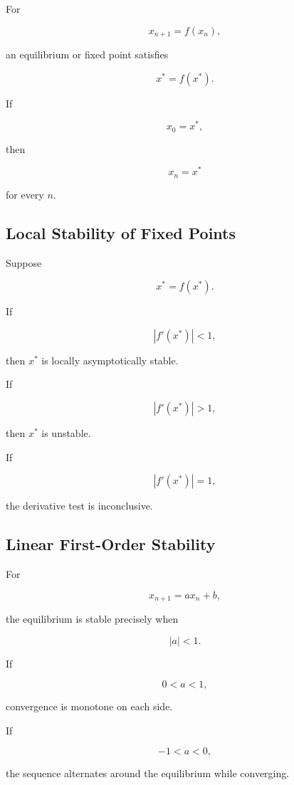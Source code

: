 For

\[
x_{n+1}=f(x_n),
\]

an equilibrium or fixed point satisfies

\[
\boxed{
x^*=f(x^*).
}
\]

If

\[
x_0=x^*,
\]

then

\[
x_n=x^*
\]

for every \(n\).

\subsection{Local Stability of Fixed Points}
\label{subsec:difference-fixed-point-stability}

Suppose

\[
x^*=f(x^*).
\]

If

\[
\boxed{
|f'(x^*)|<1,
}
\]

then \(x^*\) is locally asymptotically stable.

If

\[
\boxed{
|f'(x^*)|>1,
}
\]

then \(x^*\) is unstable.

If

\[
\boxed{
|f'(x^*)|=1,
}
\]

the derivative test is inconclusive.

\subsection{Linear First-Order Stability}
\label{subsec:linear-first-order-difference-stability}

For

\[
x_{n+1}=ax_n+b,
\]

the equilibrium is stable precisely when

\[
\boxed{
|a|<1.
}
\]

If

\[
0<a<1,
\]

convergence is monotone on each side.

If

\[
-1<a<0,
\]

the sequence alternates around the equilibrium while converging.

